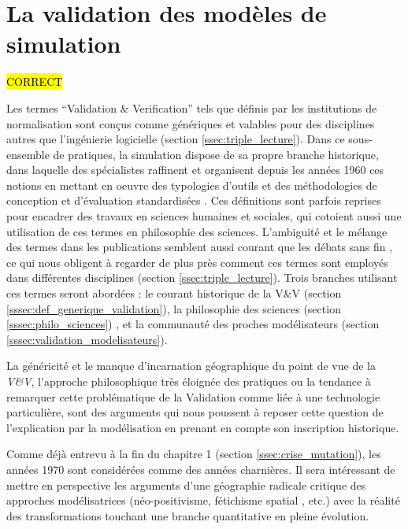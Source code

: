 
\section{La validation des modèles de simulation}
\label{sec:constante_problematique}

\hl{CORRECT}

Les termes \foreignquote{english}{Validation \& Verification} tels que définis par les institutions de normalisation sont conçus comme génériques et valables pour des disciplines autres que l'ingénierie logicielle (section \ref{ssec:triple_lecture}). Dans ce sous-ensemble de pratiques, la simulation dispose de sa propre branche historique, dans laquelle des spécialistes raffinent et organisent depuis les années 1960 ces notions en mettant en oeuvre des typologies d'outils et des méthodologies de conception et d'évaluation standardisées \autocite{Nance2002}. Ces définitions sont parfois reprises pour encadrer des travaux en sciences humaines et sociales, qui cotoient aussi une utilisation de ces termes en philosophie des sciences. L'ambiguité et le mélange des termes dans les publications semblent aussi courant que les débats sans fin \autocite{Numo2007,Augusiak2014}, ce qui nous obligent à regarder de plus près comment ces termes sont employés dans différentes disciplines (section \ref{ssec:triple_lecture}). Trois branches utilisant ces termes seront abordées : le courant historique de la V\&V (section \ref{sssec:def_generique_validation}), la philosophie des sciences (section \ref{sssec:philo_sciences}) , et la communauté des proches modélisateurs (section \ref{sssec:validation_modelisateurs}).


La généricité et le manque d'incarnation géographique du point de vue de la \textit{V\&V}, l'approche philosophique très éloignée des pratiques ou la tendance à remarquer cette problématique de la Validation comme liée à une technologie particulière, sont des arguments qui nous poussent à reposer cette question de l'explication par la modélisation en prenant en compte son inscription historique.

Comme déjà entrevu à la fin du chapitre 1 (section \ref{ssec:crise_mutation}), les années 1970 sont considérées comme des années charnières. Il sera intéressant de mettre en perspective les arguments d'une géographie radicale critique des approches modélisatrices (néo-positivisme, fétichisme spatial , etc.) avec la réalité des transformations touchant une branche quantitative en pleine évolution.

